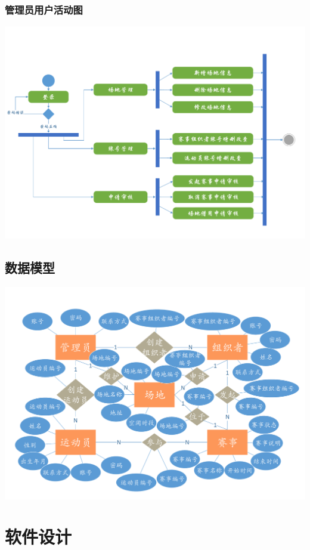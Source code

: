 \documentclass[a4paper,UTF8]{article}
\begin{document}
\subsubsection{管理员用户活动图}
{\centering\includegraphics[width=1\columnwidth]{ac3}
	
}


\subsection{数据模型}
{\centering\includegraphics[width=1\columnwidth]{ER}
	
}


\section{软件设计}
\end{document}
